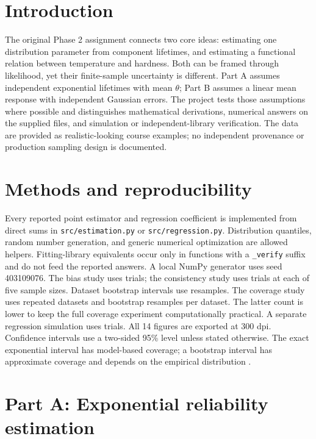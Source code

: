 \documentclass[11pt,a4paper]{article}
\newcommand{\sectionpage}[2]{\clearpage\pagecolor{#1}\section{#2}}
\begin{document}
\section{Introduction}
The original Phase 2 assignment \cite{assignment} connects two core ideas: estimating one distribution parameter from component lifetimes, and estimating a functional relation between temperature and hardness. Both can be framed through likelihood, yet their finite-sample uncertainty is different. Part A assumes independent exponential lifetimes with mean $\theta$; Part B assumes a linear mean response with independent Gaussian errors. The project tests those assumptions where possible and distinguishes mathematical derivations, numerical answers on the supplied files, and simulation or independent-library verification. The data are provided as realistic-looking course examples; no independent provenance or production sampling design is documented.

\section{Methods and reproducibility}
Every reported point estimator and regression coefficient is implemented from direct sums in \texttt{src/estimation.py} or \texttt{src/regression.py}. Distribution quantiles, random number generation, and generic numerical optimization are allowed helpers. Fitting-library equivalents occur only in functions with a \texttt{\_verify} suffix and do not feed the reported answers. A local NumPy generator uses seed 403109076. The bias study uses \BiasTrials{} trials; the consistency study uses \ConsistencyTrials{} trials at each of five sample sizes. Dataset bootstrap intervals use \BootData{} resamples. The coverage study uses \CoverageTrials{} repeated datasets and \CoverageBoot{} bootstrap resamples per dataset. The latter count is lower to keep the full coverage experiment computationally practical. A separate regression simulation uses \RegMCTrials{} trials. All 14 figures are exported at 300 dpi. Confidence intervals use a two-sided 95\% level unless stated otherwise. The exact exponential interval has model-based coverage; a bootstrap interval has approximate coverage and depends on the empirical distribution \cite{bootstrap}.

\sectionpage{softgreen}{Part A: Exponential reliability estimation}
\end{document}
